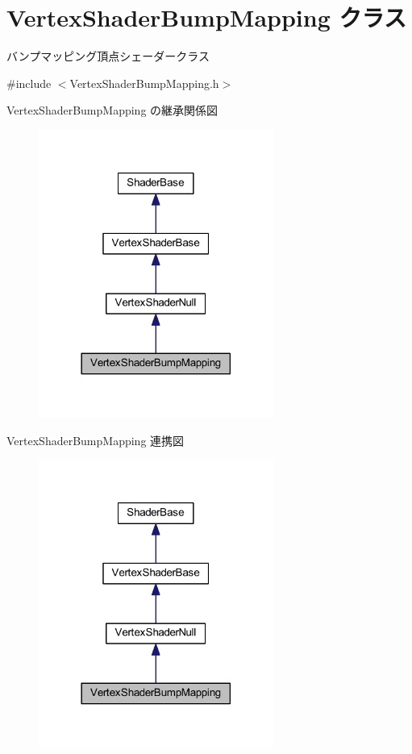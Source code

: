 \hypertarget{class_vertex_shader_bump_mapping}{}\section{Vertex\+Shader\+Bump\+Mapping クラス}
\label{class_vertex_shader_bump_mapping}


バンプマッピング頂点シェーダークラス  




{\ttfamily \#include $<$Vertex\+Shader\+Bump\+Mapping.\+h$>$}



Vertex\+Shader\+Bump\+Mapping の継承関係図\nopagebreak
\begin{figure}[H]
\begin{center}
\leavevmode
\includegraphics[width=218pt]{class_vertex_shader_bump_mapping__inherit__graph}
\end{center}
\end{figure}


Vertex\+Shader\+Bump\+Mapping 連携図\nopagebreak
\begin{figure}[H]
\begin{center}
\leavevmode
\includegraphics[width=218pt]{class_vertex_shader_bump_mapping__coll__graph}
\end{center}
\end{figure}
